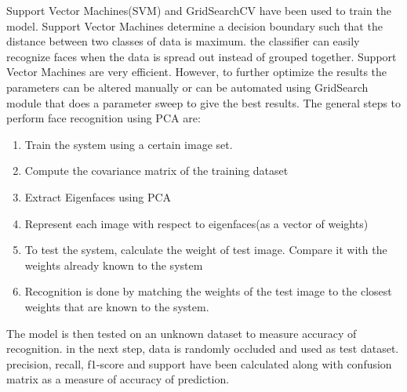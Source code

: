\documentclass[conference]{IEEEtran}
\begin{document}
Support Vector Machines(SVM) and GridSearchCV have been used to train the model. Support Vector Machines determine a decision boundary such that the distance between two classes of data is maximum. the classifier can easily recognize faces when the data is spread out instead of grouped together. Support Vector Machines are very efficient. However, to further optimize the results the parameters can be altered manually or can be automated using GridSearch module that does a parameter sweep to give the best results.
The general steps to perform face recognition using PCA are:
\begin{enumerate}
\item Train the system using a certain image set.
\item Compute the covariance matrix of the training dataset
\item Extract Eigenfaces using PCA
\item Represent each image with respect to eigenfaces(as a vector of weights)
\item To test the system, calculate the weight of test image. Compare it with the weights already known to the system
\item Recognition is done by matching the weights of the test image to the closest weights that are known to the system. 
\end{enumerate}
	
The model is then tested on an unknown dataset to measure accuracy of recognition. in the next step, data is randomly occluded and used as test dataset. precision, recall, f1-score and support have been calculated along with confusion matrix as a measure of accuracy of prediction. 
\end{document}
